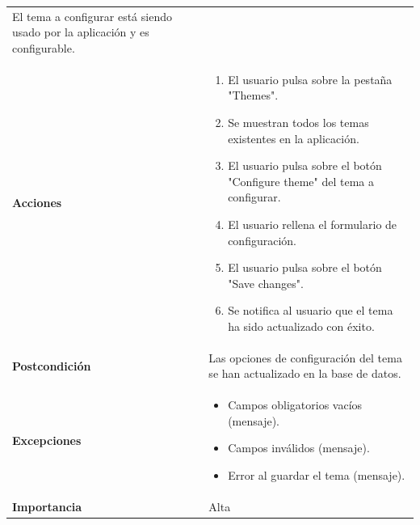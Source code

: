 \documentclass[
]{article}
\providecommand{\tightlist}{%
  \setlength{\itemsep}{0pt}\setlength{\parskip}{0pt}}
\begin{document}
\begin{longtable}[]{@{}ll@{}}
\begin{minipage}[t]{0.71\columnwidth}
El tema a configurar está siendo usado por la aplicación y es
configurable.\strut
\end{minipage}\tabularnewline
\begin{minipage}[t]{0.23\columnwidth}\raggedright
\textbf{Acciones}\strut
\end{minipage} & \begin{minipage}[t]{0.71\columnwidth}\raggedright
\begin{enumerate}
\def\labelenumi{\arabic{enumi}.}
\tightlist
\item
  El usuario pulsa sobre la pestaña "Themes".
\item
  Se muestran todos los temas existentes en la aplicación.
\item
  El usuario pulsa sobre el botón "Configure theme" del tema a
  configurar.
\item
  El usuario rellena el formulario de configuración.
\item
  El usuario pulsa sobre el botón "Save changes".
\item
  Se notifica al usuario que el tema ha sido actualizado con éxito.
\end{enumerate}\strut
\end{minipage}\tabularnewline
\begin{minipage}[t]{0.23\columnwidth}\raggedright
\textbf{Postcondición}\strut
\end{minipage} & \begin{minipage}[t]{0.71\columnwidth}\raggedright
Las opciones de configuración del tema se han actualizado en la base de
datos.\strut
\end{minipage}\tabularnewline
\begin{minipage}[t]{0.23\columnwidth}\raggedright
\textbf{Excepciones}\strut
\end{minipage} & \begin{minipage}[t]{0.71\columnwidth}\raggedright
\begin{itemize}
\tightlist
\item
  Campos obligatorios vacíos (mensaje).
\item
  Campos inválidos (mensaje).
\item
  Error al guardar el tema (mensaje).
\end{itemize}\strut
\end{minipage}\tabularnewline
\begin{minipage}[t]{0.23\columnwidth}\raggedright
\textbf{Importancia}\strut
\end{minipage} & \begin{minipage}[t]{0.71\columnwidth}\raggedright
Alta\strut
\end{minipage}\tabularnewline
\bottomrule
\end{longtable}
\end{document}
